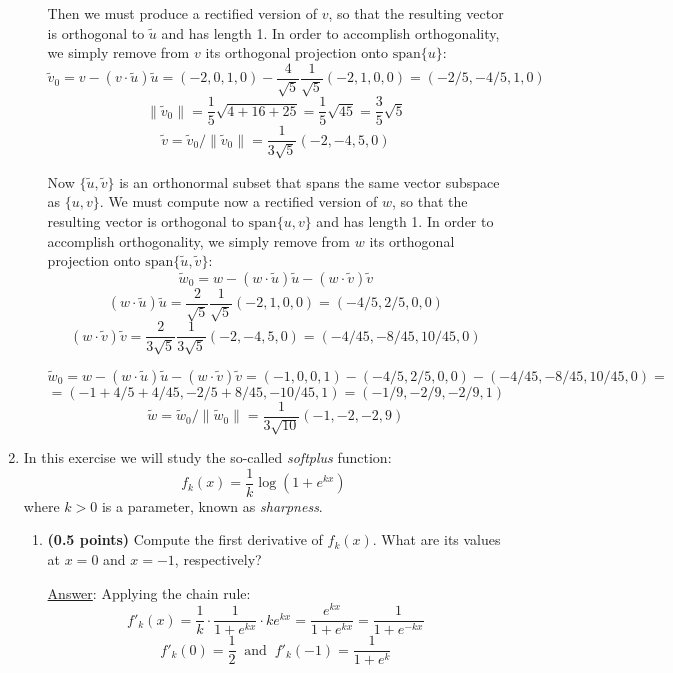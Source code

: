 \documentclass[]{book}
\theoremstyle{definition}
\newcommand\ans{\underline{Answer}: }
\begin{document}
\begin{enumerate}
\begin{enumerate}
Then we must produce a rectified version of $v$, so that the resulting vector is orthogonal to $\tilde{u}$ and has length 1. In order to accomplish orthogonality, we simply remove from $v$ its orthogonal projection onto $\textrm{span}\{u\}$:
\[
\tilde{v}_0 = v - (v\cdot \tilde{u})\tilde{u} = (-2,0,1,0) - \frac{4}{\sqrt{5}} \frac{1}{\sqrt{5}} (-2,1,0,0) = (-2/5, -4/5, 1, 0)
\]
\[
\|\tilde{v}_0\| = \frac{1}{5} \sqrt{4 + 16 + 25} = \frac{1}{5}\sqrt{45} = \frac{3}{5}\sqrt{5}
\]
\[
\tilde{v} = \tilde{v}_0 / \| \tilde{v}_0 \| = \frac{1}{3\sqrt{5}} (-2,-4,5,0)
\]


Now $\{\tilde{u}, \tilde{v}\}$ is an orthonormal subset that spans the same vector subspace as $\{u,v\}$. We must compute now a rectified version of $w$, so that the resulting vector is orthogonal to $\textrm{span}\{u,v\}$ and has length 1. In order to accomplish orthogonality, we simply remove from $w$ its orthogonal projection onto $\textrm{span}\{\tilde{u}, \tilde{v}\}$:
\[
\tilde{w}_0 = w - (w\cdot \tilde{u})\tilde{u} - (w\cdot \tilde{v})\tilde{v}
\]
\[
(w\cdot \tilde{u})\tilde{u} = \frac{2}{\sqrt{5}}\frac{1}{\sqrt{5}}(-2,1,0,0) = (-4/5, 2/5, 0, 0)
\]
\[
(w\cdot \tilde{v})\tilde{v} =  \frac{2}{3\sqrt{5}}\frac{1}{3\sqrt{5}}(-2,-4,5,0) = (-4/45, -8/45, 10/45, 0)
\]

\[
\tilde{w}_0 = w - (w\cdot \tilde{u})\tilde{u} - (w\cdot \tilde{v})\tilde{v} = (-1, 0, 0, 1) - (-4/5, 2/5, 0, 0) - (-4/45, -8/45, 10/45, 0) =
\]
\[
= (-1 + 4/5 + 4/45, -2/5 + 8/45, -10/45, 1) = (-1/9, -2/9, -2/9, 1)
\]
\[
\tilde{w} = \tilde{w}_0 / \| \tilde{w}_0 \| = \frac{1}{3\sqrt{10}} (-1, -2, -2, 9)
\]



\end{enumerate}



\item In this exercise we will study the so-called \emph{softplus} function:
\[
f_k(x) = \frac{1}{k}\log(1+e^{kx})
\]
where $k>0$ is a parameter, known as \emph{sharpness}.

\begin{enumerate}

\item {\bf(0.5 points)} Compute the first derivative of $f_k(x)$. What are its values at $x=0$ and $x=-1$, respectively?

\ans
Applying the chain rule:
\[
f'_k(x) =\frac{1}{k} \cdot \frac{1}{1+e^{kx}} \cdot ke^{kx}  = \frac{e^{kx}}{1+e^{kx}} = \frac{1}{1 + e^{-kx}}
\]
\[
f'_k(0) = \frac{1}{2} \;\; \textrm{and} \;\; f'_k(-1) = \frac{1}{1+e^{k}}
\]


\end{enumerate}
\end{enumerate}
\end{document}
